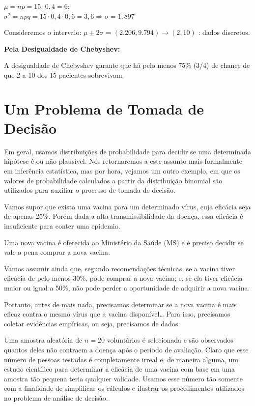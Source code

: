 \documentclass[
]{book}
\theoremstyle{definition}
\theoremstyle{definition}
\theoremstyle{definition}
\theoremstyle{remark}
\begin{document}
\(\mu = np = 15 \cdot 0,4 = 6\);\\
\(\sigma^2 = npq = 15 \cdot 0,4 \cdot 0,6 = 3,6 \Rightarrow \sigma = 1,897\)

Consideremos o intervalo: \(\mu \pm 2\sigma\) = \((2.206, 9.794) \rightarrow (2, 10)\) : dados discretos.

\textbf{Pela Desigualdade de Chebyshev:}

A desigualdade de Chebyshev garante que há pelo menos 75\% (3/4) de chance de que 2 a 10 dos 15 pacientes sobrevivam.

\hypertarget{um-problema-de-tomada-de-decisuxe3o}{%
\section{Um Problema de Tomada de Decisão}\label{um-problema-de-tomada-de-decisuxe3o}}

Em geral, usamos distribuições de probabilidade para decidir se uma determinada hipótese é ou não plausível. Nós retornaremos a este assunto mais formalmente em inferência estatística, mas por hora, vejamos um outro exemplo, em que os valores de probabilidade calculados a partir da distribuição binomial são utilizados para auxiliar o processo de tomada de decisão.

Vamos supor que exista uma vacina para um determinado vírus, cuja eficácia seja de apenas 25\%. Porém dada a alta transmissibilidade da doença, essa eficácia é insuficiente para conter uma epidemia.

Uma nova vacina é oferecida ao Ministério da Saúde (MS) e é preciso decidir se vale a pena comprar a nova vacina.

Vamos assumir ainda que, segundo recomendações técnicas, se a vacina tiver eficácia de pelo menos 30\%, pode comprar a nova vacina; e, se ela tiver eficácia maior ou igual a 50\%, não pode perder a oportunidade de adquirir a nova vacina.

Portanto, antes de mais nada, precisamos determinar se a nova vacina é mais eficaz contra o mesmo vírus que a vacina disponível\ldots{} Para isso, precisamos coletar evidências empíricas, ou seja, precisamos de dados.

Uma amostra aleatória de \(n = 20\) voluntários é selecionada e são observados quantos deles não contraem a doença após o período de avaliação. Claro que esse número de pessoas testadas é completamente irreal e, de maneira alguma, um estudo científico para determinar a eficácia de uma vacina com base em uma amostra tão pequena teria qualquer validade. Usamos esse número tão somente com a finalidade de simplificar os cálculos e ilustrar os procedimentos utilizados no problema de análise de decisão.
\end{document}
